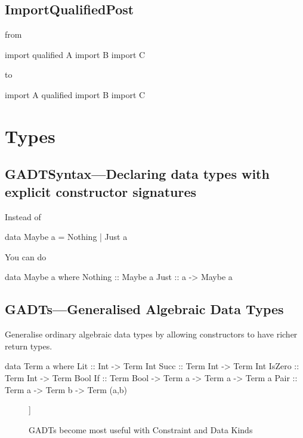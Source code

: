 \documentclass[openany, 12pt]{book}
\begin{document}
\chapter{ImportQualifiedPost}
from
\begin{haskell}{}
import qualified A
import           B
import           C
\end{haskell}

to
\begin{haskell}{}
import A qualified
import B
import C
\end{haskell}


\part{Types}


\setcounter{chapter}{7}
\chapter{GADTSyntax---Declaring data types with explicit constructor signatures}
Instead of
\begin{haskell}{}
data Maybe a = Nothing | Just a
\end{haskell}

You can do
\begin{haskell}{}
data Maybe a where
    Nothing :: Maybe a
    Just    :: a -> Maybe a
\end{haskell}

\chapter{GADTs---Generalised Algebraic Data Types}
Generalise ordinary algebraic data types by allowing constructors to have richer
return types.

\begin{haskell}{}
data Term a where
    Lit    :: Int -> Term Int
    Succ   :: Term Int -> Term Int
    IsZero :: Term Int -> Term Bool
    If     :: Term Bool -> Term a -> Term a -> Term a
    Pair   :: Term a -> Term b -> Term (a,b)
\end{haskell}

\begin{figure}[H]
	\begin{center}
		\begin{forest}
			[GADT
					[Constraint Kinds]
					[Data Kinds]
			]
		\end{forest}
	\end{center}
	\caption{GADTs become most useful with Constraint and Data Kinds}
\end{figure}
\end{document}
